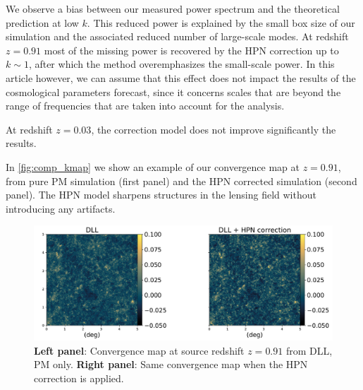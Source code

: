 \documentclass{aa}
\begin{document}
 We observe a bias between our measured power spectrum and the theoretical prediction at low $k$. This reduced power is explained by the small box size of our simulation and the associated reduced number of large-scale modes.  At redshift $z=0.91$ most of the missing
power is recovered by the HPN correction up to $k\sim 1$, after which the method overemphasizes the small-scale power. In this article however, we can assume that this effect does not impact the results of the cosmological parameters forecast, since it concerns scales that are beyond the range of frequencies that are taken into account for the analysis.

At redshift $z=0.03$, the correction model does not improve significantly the results.


In \autoref{fig:comp_kmap} we show an example of our convergence map at $ z= 0.91$, from pure PM simulation (first panel) and the HPN corrected simulation (second panel). The HPN model sharpens structures in the lensing field without introducing any artifacts.
\begin{figure}
    \centering
    \includegraphics[width=\textwidth]{paper/figures/kmap_dll_vs_hpn.pdf}
    \caption{ \textbf{Left panel}: Convergence map at source redshift $z= 0.91$ from DLL, PM only.
    \textbf{Right panel}: Same convergence map when the HPN correction is applied. 
    }
    \label{fig:comp_kmap}
\end{figure}
\end{document}
